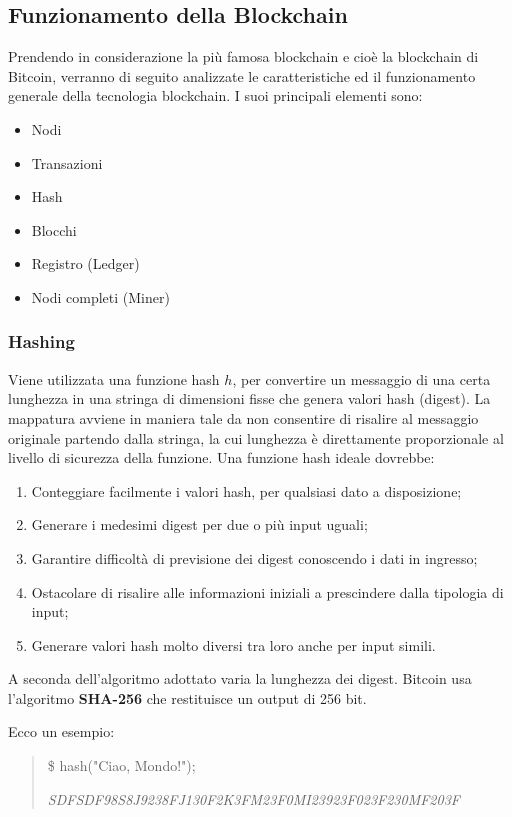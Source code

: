 \subsection{Funzionamento della Blockchain}
Prendendo in considerazione la più famosa blockchain e cioè la blockchain di Bitcoin, verranno di seguito analizzate le caratteristiche ed il funzionamento generale della tecnologia blockchain. I suoi principali elementi sono:

\begin{itemize}
  \item Nodi
  \item Transazioni
  \item Hash
  \item Blocchi
  \item Registro (Ledger)
  \item Nodi completi (Miner)
\end{itemize}

\subsubsection{Hashing}
Viene utilizzata una funzione hash \(h\), per convertire un messaggio di una certa lunghezza in una stringa di dimensioni fisse che genera valori hash (digest). La mappatura avviene in maniera tale da non consentire di risalire al messaggio originale partendo dalla stringa, la cui lunghezza è direttamente proporzionale al livello di sicurezza della funzione. Una funzione hash ideale dovrebbe:

\begin{enumerate}
  \item Conteggiare facilmente i valori hash, per qualsiasi dato a disposizione;
  \item Generare i medesimi digest per due o più input uguali;
  \item Garantire difficoltà di previsione dei digest conoscendo i dati in ingresso;
  \item Ostacolare di risalire alle informazioni iniziali a prescindere dalla tipologia di input;
  \item Generare valori hash molto diversi tra loro anche per input simili.
\end{enumerate}

A seconda dell'algoritmo adottato varia la lunghezza dei digest. Bitcoin
usa l'algoritmo \textbf{SHA-256} che restituisce un output di 256 bit.

Ecco un esempio:
\begin{quote}
  \$ hash("Ciao, Mondo!");

  \textit{SDFSDF98S8J9238FJ130F2K3FM23F0MI23923F023F230MF203F}
\end{quote}

